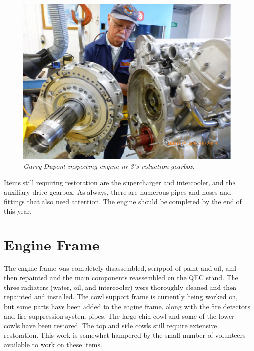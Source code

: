\begin{figure}[htbp]
   \vspace{2em}
   \centering
   \includegraphics[scale=0.5]{engine3_reduction_gear.eps}
   \caption*{\small \em Garry Dupont inspecting engine nr 3's
     reduction gearbox.}
   \label{fig:engine3gearbox}
\end{figure}

Items still requiring restoration are the supercharger and
intercooler, and the auxiliary drive gearbox.  As always, there are
numerous pipes and hoses and fittings that also need attention.  The
engine should be completed by the end of this year.

\section{Engine Frame}
\label{engineframe}

The engine frame was completely disassembled, stripped of paint and
oil, and then repainted and the main components reassembled on the QEC
stand.  The three radiators (water, oil, and intercooler) were
thoroughly cleaned and then repainted and installed.  The cowl support
frame is currently being worked on, but some parts have been added to
the engine frame, along with the fire detectors and fire suppression
system pipes.  The large chin cowl and some of the lower cowls have
been restored.  The top and side cowls still require extensive
restoration.  This work is somewhat hampered by the small number of
volunteers available to work on these items.

